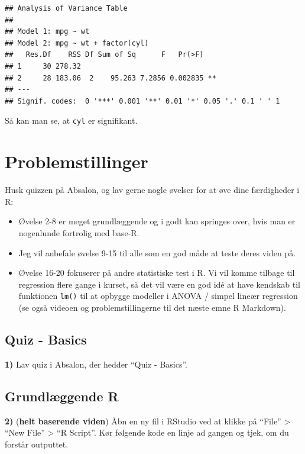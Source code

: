 \documentclass[
]{book}
\providecommand{\tightlist}{%
  \setlength{\itemsep}{0pt}\setlength{\parskip}{0pt}}
\begin{document}
\begin{verbatim}
## Analysis of Variance Table
## 
## Model 1: mpg ~ wt
## Model 2: mpg ~ wt + factor(cyl)
##   Res.Df    RSS Df Sum of Sq      F   Pr(>F)   
## 1     30 278.32                                
## 2     28 183.06  2    95.263 7.2856 0.002835 **
## ---
## Signif. codes:  0 '***' 0.001 '**' 0.01 '*' 0.05 '.' 0.1 ' ' 1
\end{verbatim}

Så kan man se, at \texttt{cyl} er signifikant.

\section{Problemstillinger}\label{problemstillinger}

Husk quizzen på Absalon, og lav gerne nogle øvelser for at øve dine færdigheder i R:

\begin{itemize}
\tightlist
\item
  Øvelse 2-8 er meget grundlæggende og i godt kan springes over, hvis man er nogenlunde fortrolig med base-R.
\item
  Jeg vil anbefale øvelse 9-15 til alle som en god måde at teste deres viden på.
\item
  Øvelse 16-20 fokuserer på andre statistiske test i R. Vi vil komme tilbage til regression flere gange i kurset, så det vil være en god idé at have kendskab til funktionen \texttt{lm()} til at opbygge modeller i ANOVA / simpel lineær regression (se også videoen og problemstillingerne til det næste emne R Markdown).
\end{itemize}

\subsection{Quiz - Basics}\label{quiz---basics}

\textbf{1)} Lav quiz i Absalon, der hedder ``Quiz - Basics''.

\subsection{Grundlæggende R}\label{grundluxe6ggende-r}

\textbf{2)} (\textbf{helt baserende viden}) Åbn en ny fil i RStudio ved at klikke på ``File'' \textgreater{} ``New File'' \textgreater{} ``R Script''. Kør følgende kode en linje ad gangen og tjek, om du forstår outputtet.
\end{document}
